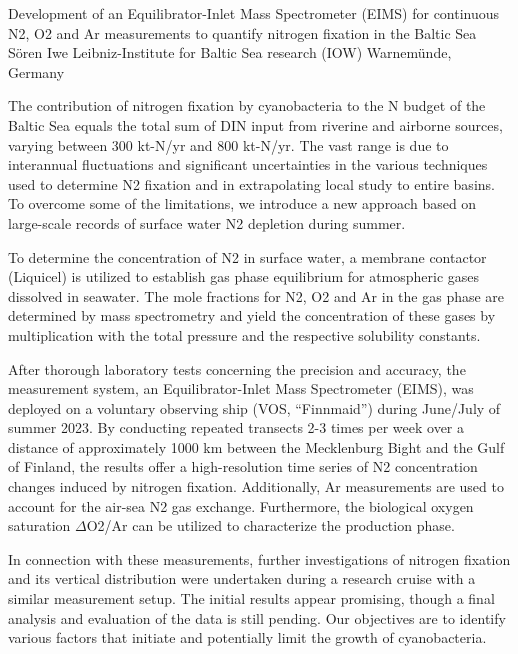 \begin{conf-abstract}
{Development of an Equilibrator-Inlet Mass Spectrometer (EIMS) for continuous N2, O2 and Ar measurements to quantify nitrogen fixation in the Baltic Sea}
{Sören Iwe}
{Leibniz-Institute for Baltic Sea research (IOW) Warnemünde, Germany}
{The contribution of nitrogen fixation by cyanobacteria to the N budget of the Baltic Sea equals the total sum of DIN input from riverine and airborne sources, varying between 300 kt-N/yr and 800 kt-N/yr. The vast range is due to interannual fluctuations and significant uncertainties in the various techniques used to determine N2 fixation and in extrapolating local study to entire basins. To overcome some of the limitations, we introduce a new approach based on large-scale records of surface water N2 depletion during summer. 

To determine the concentration of N2 in surface water, a membrane contactor (Liquicel) is utilized to establish gas phase equilibrium for atmospheric gases dissolved in seawater. The mole fractions for N2, O2 and Ar in the gas phase are determined by mass spectrometry and yield the concentration of these gases by multiplication with the total pressure and the respective solubility constants. 

After thorough laboratory tests concerning the precision and accuracy, the measurement system, an Equilibrator-Inlet Mass Spectrometer (EIMS), was deployed on a voluntary observing ship (VOS, “Finnmaid”) during June/July of summer 2023. By conducting repeated transects 2-3 times per week over a distance of approximately 1000 km between the Mecklenburg Bight and the Gulf of Finland, the results offer a high-resolution time series of N2 concentration changes induced by nitrogen fixation. Additionally, Ar measurements are used to account for the air-sea N2 gas exchange. Furthermore, the biological oxygen saturation $\Delta$O2/Ar can be utilized to characterize the production phase. 

In connection with these measurements, further investigations of nitrogen fixation and its vertical distribution were undertaken during a research cruise with a similar measurement setup.
The initial results appear promising, though a final analysis and evaluation of the data is still pending. Our objectives are to identify various factors that initiate and potentially limit the growth of cyanobacteria.}
\end{conf-abstract}
